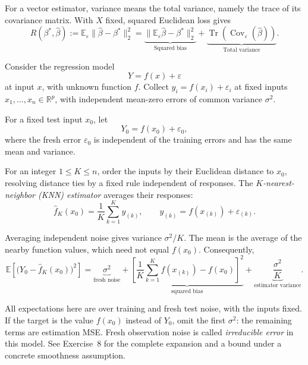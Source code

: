 \begin{definition}
    For a vector estimator, variance means the total variance, namely
the trace of its covariance matrix. With $X$ fixed, squared
Euclidean loss gives
\begin{equation}
R(\beta^\ast,\widehat\beta)
:=
\mathbb{E}_\varepsilon
\|\widehat\beta-\beta^\ast\|_2^2
=
\underbrace{
\|\mathbb{E}_\varepsilon\widehat\beta-\beta^\ast\|_2^2
}_{\text{Squared bias}}
+
\underbrace{
\operatorname{Tr}\!\left(
\operatorname{Cov}_\varepsilon(\widehat\beta)
\right)
}_{\text{Total variance}}.
\tag{4}
\end{equation}
\end{definition}

\begin{definition}
    Consider the regression model
\[
Y=f(x)+\varepsilon
\]
at input $x$, with unknown function $f$. Collect
$y_i=f(x_i)+\varepsilon_i$ at fixed inputs
$x_1,\ldots,x_n\in\mathbb{R}^p$, with independent mean-zero errors
of common variance $\sigma^2$.

For a fixed test input $x_0$, let
\[
Y_0=f(x_0)+\varepsilon_0,
\]
where the fresh error $\varepsilon_0$ is independent of the training
errors and has the same mean and variance.

For an integer $1\leq K\leq n$, order the inputs by their Euclidean
distance to $x_0$, resolving distance ties by a fixed rule independent
of responses. The \emph{$K$-nearest-neighbor (KNN) estimator} averages
their responses:
\begin{equation}
\widehat f_K(x_0)
=
\frac{1}{K}\sum_{k=1}^K y_{(k)},
\qquad
y_{(k)}=f(x_{(k)})+\varepsilon_{(k)}.
\tag{8}
\end{equation}

Averaging independent noise gives variance $\sigma^2/K$.
The mean is the average of the nearby function values, which need
not equal $f(x_0)$. Consequently,
\begin{equation}
\mathbb{E}\!\left[
\bigl(Y_0-\widehat f_K(x_0)\bigr)^2
\right]
=
\underbrace{\sigma^2}_{\text{fresh noise}}
+
\underbrace{
\left[
\frac{1}{K}\sum_{k=1}^K f(x_{(k)})-f(x_0)
\right]^2
}_{\text{squared bias}}
+
\underbrace{
\frac{\sigma^2}{K}
}_{\text{estimator variance}}.
\tag{9}
\end{equation}

All expectations here are over training and fresh test noise,
with the inputs fixed. If the target is the value $f(x_0)$ instead
of $Y_0$, omit the first $\sigma^2$: the remaining terms are
estimation MSE. Fresh observation noise is called
\emph{irreducible error} in this model. See Exercise~8 for the
complete expansion and a bound under a concrete smoothness assumption.
\end{definition}

\newpage
